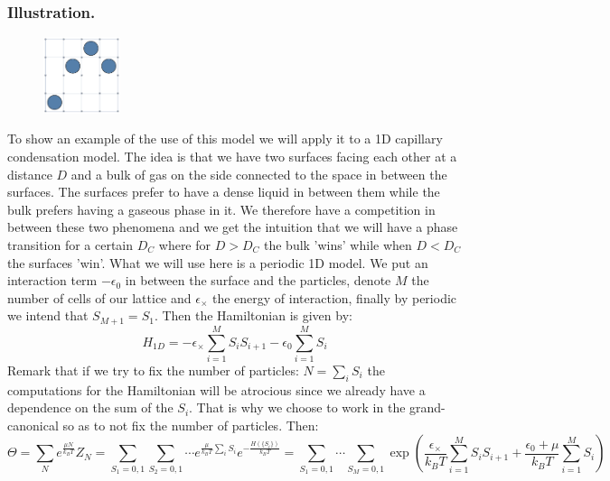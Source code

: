 \documentclass[10pt,a4paper]{book}
\begin{document}
\subsubsection{Illustration.}
\begin{figure}
\includegraphics[width = 0.2\textwidth]{graphs/ExampleCappillary}
\end{figure}
To show an example of the use of this model we will apply it to a 1D capillary condensation model. The idea is that we have two surfaces facing each other at a distance $D$ and a bulk of gas on the side connected to the space in between the surfaces. The surfaces prefer to have a dense liquid in between them while the bulk prefers having a gaseous phase in it. We therefore have a competition in between these two phenomena and we get the intuition that we will have a phase transition for a certain $D_C$ where for $D > D_C$ the bulk 'wins'  while when $D < D_C$ the surfaces 'win'. What we will use here is a periodic 1D model. We put an interaction term $-\epsilon_0$ in between the surface and the particles, denote $M$ the number of cells of our lattice and $\epsilon_\times$ the energy of interaction, finally by periodic we intend that $S_{M+1} = S_1$. Then the Hamiltonian is given by:
\[
H_{1D} = -\epsilon_\times \sum_{i = 1}^M S_i S_{i +1} - \epsilon_0\sum_{i = 1}^M S_i
\]
Remark that if we try to fix the number of particles: $N = \sum_i S_i$ the computations for the Hamiltonian will be atrocious since we already have a dependence on the sum of the $S_i$. That is why we choose to work in the grand-canonical so as to not fix the number of particles. Then:
\[
\Theta = \sum_N e^{\frac{\mu N}{k_B T}} Z_N = \sum_{S_1 = 0, 1} \sum_{S_2 = 0, 1} \cdots e^{\frac{\mu}{k_B T} \sum_i S_i} e^{- \frac{H(\{S_i\})}{k_B T}} = \sum_{S_1 = 0, 1}\cdots \sum_{S_M = 0,1} \exp(\frac{\epsilon_\times}{k_B T} \sum_{i = 1}^M S_i S_{i + 1} + \frac{\epsilon_0 + \mu}{k_B T}\sum_{i = 1}^M S_i)
\]
\end{document}
